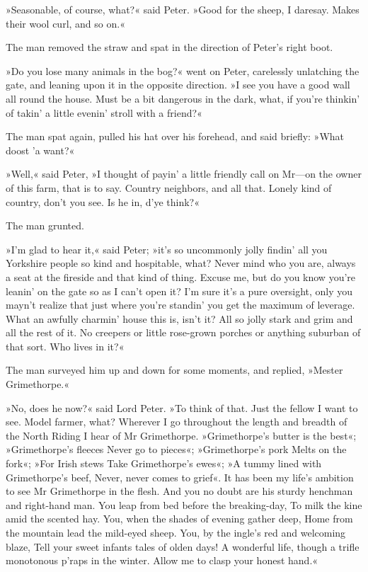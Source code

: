 »Seasonable, of course, what?« said Peter. »Good for the sheep, I daresay. Makes their wool curl, and so on.«

The man removed the straw and spat in the direction of Peter's right boot.

»Do you lose many animals in the bog?« went on Peter, carelessly unlatching the gate, and leaning upon it in the opposite direction. »I see you have a good wall all round the house. Must be a bit dangerous in the dark, what, if you're thinkin' of takin' a little evenin' stroll with a friend?«

The man spat again, pulled his hat over his forehead, and said briefly:
»What doost 'a want?«

»Well,« said Peter, »I thought of payin' a little friendly call on Mr\allowbreak---\allowbreak on the owner of this farm, that is to say. Country neighbors, and all that. Lonely kind of country, don't you see. Is he in, d'ye think?«

The man grunted.

»I'm glad to hear it,« said Peter; »it's so uncommonly jolly findin' all you Yorkshire people so kind and hospitable, what? Never mind who you are, always a seat at the fireside and that kind of thing. Excuse me, but do you know you're leanin' on the gate so as I can't open it?  I'm sure it's a pure oversight, only you mayn't realize that just where you're standin' you get the maximum of leverage. What an awfully charmin' house this is, isn't it? All so jolly stark and grim and all the rest of it. No creepers or little rose-grown porches or anything suburban of that sort. Who lives in it?«

The man surveyed him up and down for some moments, and replied, »Mester Grimethorpe.«

»No, does he now?« said Lord Peter. »To think of that. Just the fellow I want to see. Model farmer, what? Wherever I go throughout the length and breadth of the North Riding I hear of Mr Grimethorpe.  »Grimethorpe's butter is the best«; »Grimethorpe's fleeces Never go to pieces«; »Grimethorpe's pork Melts on the fork«; »For Irish stews Take Grimethorpe's ewes«; »A tummy lined with Grimethorpe's beef, Never, never comes to grief«. It has been my life's ambition to see Mr  Grimethorpe in the flesh. And you no doubt are his sturdy henchman and right-hand man. You leap from bed before the breaking-day, To milk the kine amid the scented hay. You, when the shades of evening gather deep, Home from the mountain lead the mild-eyed sheep. You, by the ingle's red and welcoming blaze, Tell your sweet infants tales of olden days! A wonderful life, though a trifle monotonous p'raps in the winter. Allow me to clasp your honest hand.«

